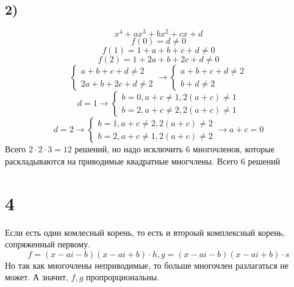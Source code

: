 \subsection*{2)}
$$x^4+ax^3+bx^2+cx+d$$
$$f(0) = d\ne 0$$
$$f(1) = 1+a+b+c+d\ne0$$
$$f(2) = 1+2a+b+2c+d\ne0$$
$$\begin{cases}
	a+b+c+d \ne 2 \\
	2a + b +2c+d \ne 2
\end{cases}\to \begin{cases}
a+b+c+d \ne 2 \\
b+d\ne 2
\end{cases}$$
$$d = 1 \to \begin{cases}b = 0, a+c\ne 1, 2(a+c)\ne 1\\
b=2, a+c\ne2, 2(a+c)\ne 1
\end{cases}$$
$$d = 2 \to \begin{cases}b = 1, a+c\ne 2, 2(a+c)\ne 2\\
	b=2, a+c\ne1, 2(a+c)\ne 2
\end{cases}\to a+c=0$$
Всего $2\cdot2\cdot 3 = 12$ решений, но надо исключить 6 многочленов, которые раскладываются на приводимые квадратные многчлены. Всего 6 решений 
\section*{4}
Если есть один комлесный корень, то есть и второый комплексный корень, сопряженный первому. 
$$f = (x-ai-b)(x-ai+b)\cdot h, g = (x-ai-b)(x-ai+b)\cdot s$$
Но так как многочлены неприводимые, то больше многочлен разлагаться не может. А значит, $f, g$ пропрорциональны. 


